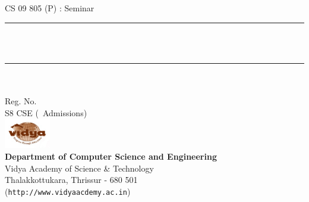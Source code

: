 %
%
\begin{titlepage}
\newcommand{\HRule}{\rule{\linewidth}{0.5mm}}
\begin{center}
{\large \sffamily CS 09 805 (P) : Seminar}\\[0.2cm]
\HRule \\[0.5cm]
{ \huge\sffamily \bfseries \vtitle}\\[0.2cm]
\HRule \\[5.25cm]
{\Large \sffamily\bfseries  \vauthor}\\
{\large \sffamily Reg. No. \vregisternumber\\ 
S8 CSE (\vadmissionyear\ Admissions)} \\[4.5cm] 
\includegraphics[width=0.15\textwidth]{VidyaLogo}\\[0.3cm]
{\Large \sffamily\bfseries Department of Computer Science and Engineering}\\ {\large\sffamily Vidya Academy of Science \& Technology\\ \normalsize Thalakkottukara, Thrissur - 680 501}\\
({\tt http://www.vidyaacdemy.ac.in})\\
\end{center}
\end{titlepage}
%
%
